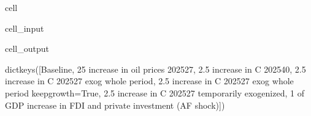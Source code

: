 \documentclass[letterpaper,10pt,english]{jupyterBook}
\begin{document}
\begin{sphinxuseclass}{cell}\begin{sphinxVerbatimInput}

\begin{sphinxuseclass}{cell_input}
\begin{sphinxVerbatim}[commandchars=\\\{\}]
\end{sphinxVerbatim}

\end{sphinxuseclass}\end{sphinxVerbatimInput}
\begin{sphinxVerbatimOutput}

\begin{sphinxuseclass}{cell_output}
\begin{sphinxVerbatim}[commandchars=\\\{\}]
dict\PYGZus{}keys([\PYGZsq{}Baseline\PYGZsq{}, \PYGZsq{}\PYGZdl{}25 increase in oil prices 2025\PYGZhy{}27\PYGZsq{}, \PYGZsq{}2.5\PYGZpc{} increase in C 2025\PYGZhy{}40\PYGZsq{}, \PYGZsq{}2.5\PYGZpc{} increase in C 2025\PYGZhy{}27 \PYGZhy{}\PYGZhy{} exog whole period\PYGZsq{}, \PYGZsq{}2.5\PYGZpc{} increase in C 2025\PYGZhy{}27 \PYGZhy{}\PYGZhy{} exog whole period \PYGZhy{}\PYGZhy{}keep\PYGZus{}growth=True\PYGZsq{}, \PYGZsq{}2.5\PYGZpc{} increase in C 2025\PYGZhy{}27 \PYGZhy{}\PYGZhy{} temporarily exogenized\PYGZsq{}, \PYGZsq{}1 \PYGZpc{} of GDP increase in FDI and private investment (AF shock)\PYGZsq{}])
\end{sphinxVerbatim}

\end{sphinxuseclass}\end{sphinxVerbatimOutput}

\end{sphinxuseclass}
\end{document}
